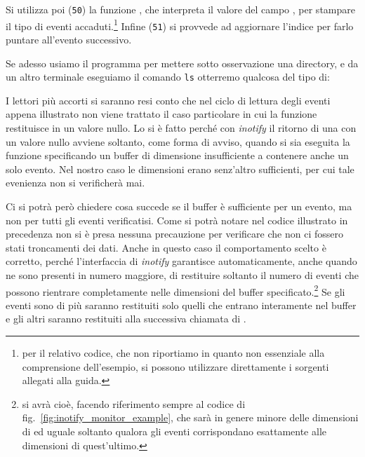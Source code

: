 Si utilizza poi (\texttt{\small 50}) la funzione , che
interpreta il valore del campo , per stampare il tipo di
eventi accaduti.\footnote{per il relativo codice, che non riportiamo in quanto
  non essenziale alla comprensione dell'esempio, si possono utilizzare
  direttamente i sorgenti allegati alla guida.} Infine (\texttt{\small 51}) si
provvede ad aggiornare l'indice  per farlo puntare all'evento
successivo.

Se adesso usiamo il programma per mettere sotto osservazione una directory, e
da un altro terminale eseguiamo il comando \texttt{ls} otterremo qualcosa del
tipo di:

I lettori più accorti si saranno resi conto che nel ciclo di lettura degli
eventi appena illustrato non viene trattato il caso particolare in cui la
funzione  restituisce in  un valore nullo. Lo si è fatto
perché con \textit{inotify} il ritorno di una  con un valore nullo
avviene soltanto, come forma di avviso, quando si sia eseguita la funzione
specificando un buffer di dimensione insufficiente a contenere anche un solo
evento. Nel nostro caso le dimensioni erano senz'altro sufficienti, per cui
tale evenienza non si verificherà mai.

Ci si potrà però chiedere cosa succede se il buffer è sufficiente per un
evento, ma non per tutti gli eventi verificatisi. Come si potrà notare nel
codice illustrato in precedenza non si è presa nessuna precauzione per
verificare che non ci fossero stati troncamenti dei dati. Anche in questo caso
il comportamento scelto è corretto, perché l'interfaccia di \textit{inotify}
garantisce automaticamente, anche quando ne sono presenti in numero maggiore,
di restituire soltanto il numero di eventi che possono rientrare completamente
nelle dimensioni del buffer specificato.\footnote{si avrà cioè, facendo
  riferimento sempre al codice di fig.~\ref{fig:inotify_monitor_example}, che
   sarà in genere minore delle dimensioni di  ed uguale
  soltanto qualora gli eventi corrispondano esattamente alle dimensioni di
  quest'ultimo.} Se gli eventi sono di più saranno restituiti solo quelli che
entrano interamente nel buffer e gli altri saranno restituiti alla successiva
chiamata di .

